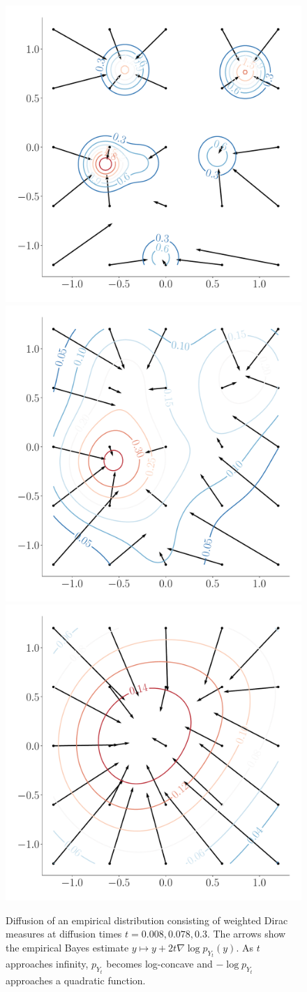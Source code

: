\begin{figure}
	\centering
	\includegraphics[width=.33\linewidth]{quiver/0.008}%
	\includegraphics[width=.33\linewidth]{quiver/0.078}%
	\includegraphics[width=.33\linewidth]{quiver/0.300}
	\caption[Example of the diffusion partial differential equation on an empirical density]{%
		 Diffusion of an empirical distribution consisting of weighted Dirac measures at diffusion times \( t = \num{0.008}, \num{0.078}, \num{0.3} \).
		 The arrows show the empirical Bayes estimate \( y \mapsto y + \num{2}t \nabla \log p_{Y_t}(y) \).
		As \( t \) approaches infinity, \( p_{Y_t} \) becomes log-concave and \( -\log p_{Y_t} \) approaches a quadratic function.
}%
	\label{fig:diffusion toy example}
\end{figure}

